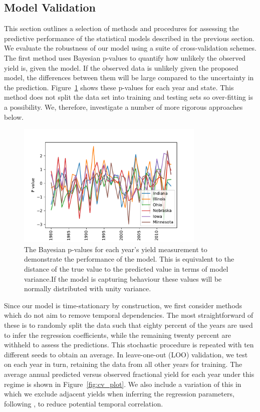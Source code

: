 \documentclass[12pt]{iopart}
\newcommand{\remove}[1]{}
\newcommand{\add}[1]{#1}
\begin{document}
\subsection{Model Validation}
\label{sec:validation}

This section outlines a selection of methods and procedures for assessing the predictive performance of the statistical models described in the previous section. We evaluate the robustness of our model using a suite of cross-validation schemes. The first method uses Bayesian p-values to quantify how unlikely the observed yield is, given the model. If the observed data is unlikely given the proposed model, the differences between them will be large compared to the uncertainty in the prediction. Figure~\ref{fig:pvalues_all} shows these p-values for each year and state. This method does not split the data set into training and testing sets so over-fitting is a possibility. We, therefore, investigate a number of more rigorous approaches below.

\begin{figure}
\centering
\includegraphics[width=0.8\textwidth]{./figures/pvalues_all}
\caption{\label{fig:pvalues_all} The Bayesian p-values for each year's yield measurement to demonstrate the performance of the model. This is equivalent to the distance of the true value to the predicted value in terms of model variance.If the model is capturing behaviour these values will be normally distributed with unity variance.}
\end{figure}


Since our model is time-stationary by construction, we first consider methods which do not aim to remove temporal dependencies. The most straightforward of these is to randomly split the data such that eighty percent of the years are used to infer the regression coefficients, while the remaining twenty percent are withheld to assess the predictions. This stochastic procedure is repeated with ten different seeds to obtain an average. In leave-one-out (LOO) validation, we test on each year in turn, retaining the data from all other years for training. The average annual predicted versus observed fractional yield for each year under this regime is shown in Figure~\ref{fig:cv_plot}. We also include a variation of this in which we exclude \remove{those adjacent to it}\add{adjacent yields} when inferring the regression parameters, following \citep{iizumi:2018},\remove{ with the view} to reduce potential temporal correlation.
\end{document}
